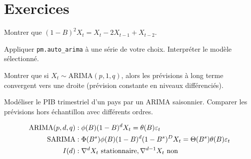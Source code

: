 \section{Exercices}

\begin{exercice}[$\star$]
Montrer que $(1-B)^2 X_t = X_t - 2X_{t-1}+X_{t-2}$.
\end{exercice}

\begin{exercice}[$\star$]
Appliquer \texttt{pm.auto\_arima} \`a une s\'erie de votre choix. Interpr\'eter le mod\`ele s\'electionn\'e.
\end{exercice}

\begin{exercice}[$\star\star$]
Montrer que si $X_t\sim\text{ARIMA}(p,1,q)$, alors les pr\'evisions \`a long terme convergent vers une droite (pr\'evision constante en niveaux diff\'erenci\'es).
\end{exercice}

\begin{exercice}
Mod\'eliser le PIB trimestriel d'un pays par un ARIMA saisonnier. Comparer les pr\'evisions hors \'echantillon avec diff\'erents ordres.
\end{exercice}

\begin{formules}
\begin{align*}
\text{ARIMA}(p,d,q) &: \phi(B)(1-B)^d X_t = \theta(B)\varepsilon_t \\
\text{SARIMA} &: \Phi(B^s)\phi(B)(1-B)^d(1-B^s)^D X_t = \Theta(B^s)\theta(B)\varepsilon_t \\
I(d) &: \nabla^d X_t\text{ stationnaire}, \nabla^{d-1}X_t\text{ non}
\end{align*}
\end{formules}
